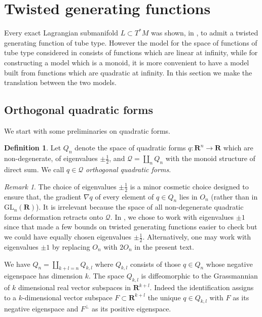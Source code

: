 \documentclass[reqno]{amsart}
\theoremstyle{theorem}
\theoremstyle{remark}
\newtheorem{remark}[corollary]{Remark}
\theoremstyle{definition}
\newtheorem{definition}[corollary]{Definition}
\newcommand{\bR}{\mathbf{R}}
\newcommand{\R}{\mathbf{R}}
\newcommand{\QQ}{\mathcal{Q}}
\begin{document}
\section{Twisted generating functions}\label{sec:gf}


Every exact Lagrangian submanifold $L \subset T^*M$ was shown, in \cite{ACGK}, to admit a twisted generating function of tube type. However the model for the space of functions of tube type considered in \cite{ACGK} consists of functions which are linear at infinity, while for constructing a model which is a monoid, it is more convenient to have a model built from functions which are quadratic at infinity. In this section we make the translation between the two models. 


\subsection{Orthogonal quadratic forms}


We start with some preliminaries on quadratic forms.


\begin{definition}
Let $Q_n$ denote the space of quadratic forms $q:\bR^n \to \bR$ which are non-degenerate, of eigenvalues $\pm \frac{1}{2}$, and $\QQ=\coprod_n Q_n$ with the monoid structure of direct sum. We call $q \in \QQ$ {\em orthogonal quadratic forms}. 
\end{definition}


\begin{remark}
The choice of eigenvalues $\pm\frac{1}{2}$ is a minor cosmetic choice designed to ensure that, the gradient $\nabla q$ of every element of $q\in Q_n$ lies in $O_n$ (rather than  in $\mathrm{GL}_n(\R)$).
It is irrelevant because the space of all non-degenerate quadratic forms deformation retracts
onto $\QQ$. In \cite{ACGK}, we chose to work with eigenvalues $\pm 1$ since that made a few bounds on twisted generating functions
easier to check but we could have equally chosen eigenvalues $\pm \frac{1}{2}$. Alternatively, one may work with eigenvalues $\pm 1$ by replacing $O_n$ with $2 O_n$ in the present text.
\end{remark}


We have $Q_n=\coprod_{k+l=n} Q_{k,l}$ where $Q_{k,l}$ consists of those $q \in Q_n$ whose  negative eigenspace has dimension $k$. The space $Q_{k,l}$ is diffeomorphic to the Grassmannian of $k$ dimensional real vector subspaces in $\R^{k+l}$. Indeed the identification assigns to a $k$-dimensional vector subspace $F \subset \bR^{k+l}$ the unique $q \in Q_{k,l}$ with $F$ as its negative eigenspace and $F^\perp$ as its positive eigenspace.
\end{document}
